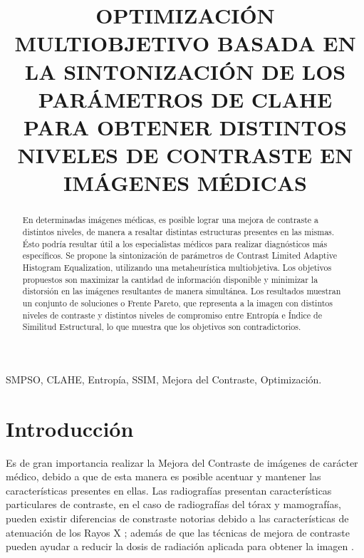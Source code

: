\documentclass[spanish,twocolumn]{article}
\title{OPTIMIZACIÓN MULTIOBJETIVO BASADA EN LA SINTONIZACIÓN DE LOS PARÁMETROS DE CLAHE PARA OBTENER DISTINTOS NIVELES DE CONTRASTE EN IMÁGENES MÉDICAS}
\begin{document}
%
\maketitle
%
\begin{abstract}
En determinadas imágenes médicas, es posible lograr una mejora de contraste a distintos niveles, de manera a resaltar distintas estructuras presentes en las mismas. Ésto podría resultar útil a los especialistas médicos para realizar diagnósticos más específicos. Se propone la sintonización de parámetros de Contrast Limited Adaptive Histogram Equalization, utilizando una metaheurística multiobjetiva. Los objetivos propuestos son maximizar la cantidad de información disponible y minimizar la distorsión en las imágenes resultantes de manera simultánea. Los resultados muestran un conjunto de soluciones o Frente Pareto, que representa a la imagen con distintos niveles de contraste y distintos niveles de compromiso entre Entropía e Índice de Similitud Estructural, lo que muestra que los objetivos son contradictorios. 
\end{abstract}
%
\begin{keywords}
SMPSO, CLAHE, Entropía, SSIM, Mejora del Contraste, Optimización.
\end{keywords}
%
\section{Introducción}
\label{sec:intro}

Es de gran importancia realizar la Mejora del Contraste de imágenes de carácter médico, debido a que de esta manera es posible acentuar y mantener las características presentes en ellas. Las radiografías presentan características particulares de contraste, en el caso de radiografías del tórax y mamografías, pueden existir diferencias de constraste notorias debido a las características de atenuación de los Rayos X \cite{chang1998image}; además de que las técnicas de mejora de contraste pueden ayudar a reducir la dosis de radiación aplicada para obtener la imagen \cite{zhang2009mammograms}.
\end{document}
